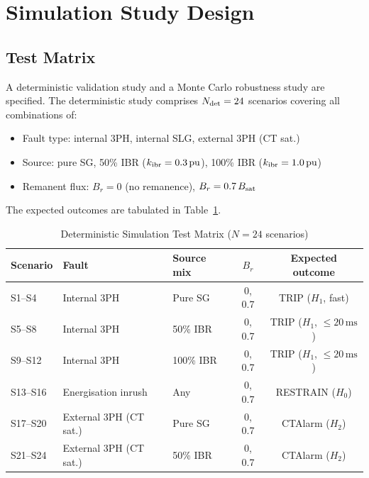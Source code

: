 \documentclass[11pt, a4paper]{article}
\newcommand{\pu}{\,\text{pu}}
\newcommand{\ms}{\,\text{ms}}
\begin{document}
\section{Simulation Study Design}
\label{sec:simulation}

\subsection{Test Matrix}

A deterministic validation study and a Monte Carlo robustness study are
specified.  The deterministic study comprises $N_{\rm det} = 24$ scenarios
covering all combinations of:

\begin{itemize}
  \item Fault type: internal 3PH, internal SLG, external 3PH (CT sat.)
  \item Source: pure SG, 50\% IBR ($k_{\rm ibr} = 0.3\pu$), 100\% IBR
    ($k_{\rm ibr} = 1.0\pu$)
  \item Remanent flux: $B_r = 0$ (no remanence), $B_r = 0.7\,B_{\rm sat}$
\end{itemize}

The expected outcomes are tabulated in Table~\ref{tab:sim_matrix}.

\begin{table}[!t]
\centering
\caption{Deterministic Simulation Test Matrix ($N=24$ scenarios)}
\label{tab:sim_matrix}
\renewcommand{\arraystretch}{1.10}
\begin{tabular}{lllcc}
\toprule
Scenario & Fault & Source mix & $B_r$ & Expected outcome \\
\midrule
S1--S4 & Internal 3PH & Pure SG & 0, 0.7 & TRIP ($H_1$, fast) \\
S5--S8 & Internal 3PH & 50\% IBR & 0, 0.7 & TRIP ($H_1$, $\leq 20\ms$) \\
S9--S12 & Internal 3PH & 100\% IBR & 0, 0.7 & TRIP ($H_1$, $\leq 20\ms$) \\
S13--S16 & Energisation inrush & Any & 0, 0.7 & RESTRAIN ($H_0$) \\
S17--S20 & External 3PH (CT sat.) & Pure SG & 0, 0.7 & CTAlarm ($H_2$) \\
S21--S24 & External 3PH (CT sat.) & 50\% IBR & 0, 0.7 & CTAlarm ($H_2$) \\
\bottomrule
\end{tabular}
\end{table}
\end{document}
